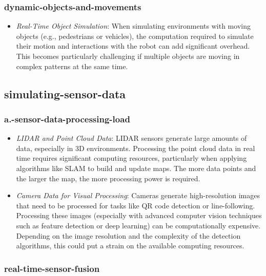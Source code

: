 \documentclass[../../main]{subfiles}
\begin{document}
    \subsubsection{dynamic-objects-and-movements}    
    \begin{itemize}
    \item
      \emph{Real-Time Object Simulation}: When simulating environments
      with moving objects (e.g., pedestrians or vehicles), the computation
      required to simulate their motion and interactions with the robot can
      add significant overhead. This becomes particularly challenging if
      multiple objects are moving in complex patterns at the same time.
    \end{itemize}
    
    \subsection{simulating-sensor-data}

    \subsubsection{a.-sensor-data-processing-load}
    \begin{itemize}
    \item
      \emph{LIDAR and Point Cloud Data}: LIDAR sensors generate large
      amounts of data, especially in 3D environments. Processing the point
      cloud data in real time requires significant computing resources,
      particularly when applying algorithms like SLAM to build and update
      maps. The more data points and the larger the map, the more processing
      power is required.
    \item
      \emph{Camera Data for Visual Processing}: Cameras generate
      high-resolution images that need to be processed for tasks like QR
      code detection or line-following. Processing these images (especially
      with advanced computer vision techniques such as feature detection or
      deep learning) can be computationally expensive. Depending on the
      image resolution and the complexity of the detection algorithms, this
      could put a strain on the available computing resources.
    \end{itemize}
    
    \subsubsection{real-time-sensor-fusion}
    
\end{document}
